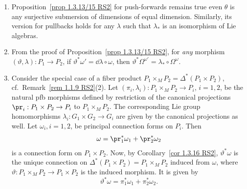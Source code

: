 \begin{rem}\label{rem 1.3.17 RS2}
    \begin{enumerate}
        \item Proposition~\ref{prop 1.3.13/15 RS2} for push-forwards remains true even $\theta$ is any surjective submersion of dimensions of equal dimension. Similarly, its version for pullbacks holds for any $\lambda$ such that $\lambda_\ast$ is an isomorphism of Lie algebras.
        \item From the proof of Proposition~\ref{prop 1.3.13/15 RS2}, for \emph{any} morphism $(\vartheta,\lambda):P_1\to P_2$, if $\vartheta^\ast \omega'=\dd\lambda\circ\omega$, then $\vartheta^\ast\Omega^{\omega'}=\lambda_\ast \circ\Omega^\omega$.
        \item Consider the special case of a fiber product $P_1\times_M P_2=\Delta^\ast(P_1\times P_2)$, cf.\ Remark~\ref{rem 1.1.9 RS2}(2). Let $(\pi_i,\lambda_i):P_1\times_M P_2\to P_i$, $i=1,2$, be the natural \gls{pfb} morphisms defined by restriction of the canonical projections $\pr_i:P_1\times P_2\to P_i$ to $P_1\times_M P_2$. The corresponding Lie group homomorphisms $\lambda_i:G_1\times G_2\to G_i$ are given by the canonical projections as well. Let $\omega_i,i=1,2$, be principal connection forms on $P_i$. Then
        \[\omega=\pr_1^\ast\omega_1+\pr_2^\ast\omega_2\]
        is a connection form on $P_1\times P_2$. Now, by Corollary~\ref{cor 1.3.16 RS2}, $\vartheta^\ast\omega$ is the unique connection on $\Delta^\ast(P_1\times P_2)=P_1\times_M P_2$ induced from $\omega$, where $\vartheta:P_1\times_M P_2\to P_1\times P_2$ is the induced morphism. It is given by
        \[\vartheta^\ast\omega=\pi_1^\ast \omega_1+\pi_2^\ast\omega_2.\label{eq 1.3.16 RS2}\]
    \end{enumerate}
\end{rem}



